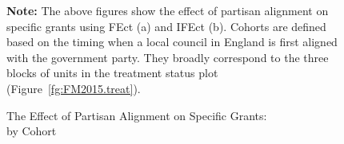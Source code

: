 \documentclass[12pt]{article}
\begin{document}
\begin{figure}[!ht]
\caption{The Effect of Partisan Alignment on Specific Grants:\\by Cohort}\label{fg:FM2015.cohort}
\centering
\begin{minipage}{1\linewidth}{
\centering
{}
}
\footnotesize\textbf{Note:} The above figures show the effect of partisan alignment on specific grants using FEct (a) and IFEct (b). Cohorts are defined based on the timing when a local council in England is first aligned with the government party. They broadly correspond to the three blocks of units in the treatment status plot (Figure~\ref{fg:FM2015.treat}).
\end{minipage}
\end{figure}
\clearpage


\newpage





\end{document}
